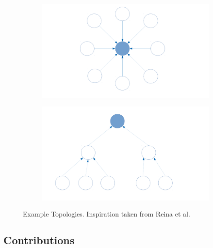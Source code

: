 \begin{figure}
\begin{subfigure}{.5\textwidth}
  \centering
  \includegraphics[width=.8\linewidth]{images/star-structure.pdf}
  \caption{}
  \label{fig:Star Topology}
\end{subfigure}%
\begin{subfigure}{.5\textwidth}
  \centering
  \includegraphics[width=.8\linewidth]{images/tree-structure.pdf}
  \caption{}
  \label{fig:Tree Topology}
\end{subfigure}
\caption{Example Topologies. Inspiration taken from Reina et al.~\cite{reina2013role}}
\label{fig:fig}
\end{figure}

\FloatBarrier


\subsection{Contributions}
\label{sec:contributions}

